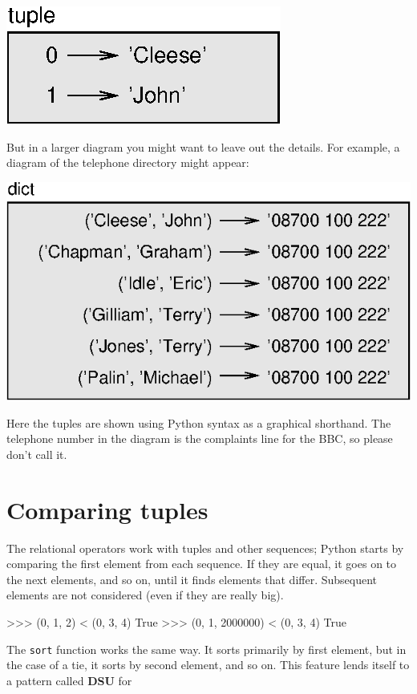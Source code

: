 
\beforefig
\centerline{\includegraphics{figs/tuple1.eps}}
\afterfig

But in a larger diagram you might want to leave out the
details.  For example, a diagram of the telephone directory might
appear:

\beforefig
\centerline{\includegraphics{figs/dict2.eps}}
\afterfig

Here the tuples are shown using Python syntax as a graphical
shorthand.
%
The telephone number in the diagram is the complaints line for the
BBC, so please don't call it.



\section{Comparing tuples}


The relational operators work with tuples and other sequences;
Python starts by comparing the first element from each
sequence.  If they are equal, it goes on to the next elements,
and so on, until it finds elements that differ.  Subsequent
elements are not considered (even if they are really big).

\beforeverb
\begin{pycode}
>>> (0, 1, 2) < (0, 3, 4)
True
>>> (0, 1, 2000000) < (0, 3, 4)
True
\end{pycode}
\afterverb
%
The {\tt sort} function works the same way.  It sorts 
primarily by first element, but in the case of a tie, it sorts
by second element, and so on.  
%
This feature lends itself to a pattern called {\bf DSU} for 

